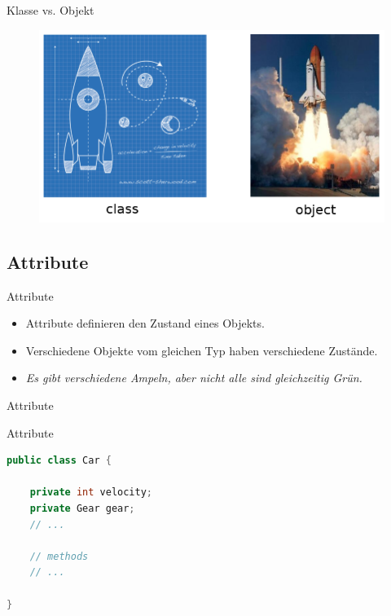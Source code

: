\documentclass[18pt]{beamer}
\begin{document}
\begin{frame}{Klasse vs. Objekt}
    \begin{figure}
        \includegraphics[scale=0.3]{img/classvsobject.png}
    \end{figure}
\end{frame}

\subsection{Attribute}

\begin{frame}{Attribute}
    \begin{itemize}
        \item Attribute definieren den Zustand eines Objekts.
        \item Verschiedene Objekte vom gleichen Typ haben verschiedene Zustände.
        \item \textit{Es gibt verschiedene Ampeln, aber nicht alle sind gleichzeitig Grün.}
    \end{itemize}
\end{frame}

\begin{frame}[fragile]{Attribute}
    \begin{exampleblock}{Attribute}
        \begin{lstlisting}[language=Java]
public class Car {

    private int velocity;
    private Gear gear;
    // ...

    // methods
    // ...

}
        \end{lstlisting}

    \end{exampleblock}

\end{frame}
\end{document}
